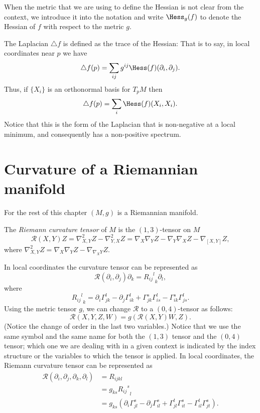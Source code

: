 When the metric that we are using to define the Hessian is not clear
from the context, we introduce it into the notation and write $\Hess_g(f)$ to denote the Hessian of $f$ with respect to the metric
$g$.


The Laplacian $\triangle f$ is defined as the
trace of the Hessian: That is to say, in local coordinates near $p$
we have
$$\triangle f(p)=\sum_{ij}g^{ij}\Hess(f)(\partial_i,\partial_j).$$
Thus, if $\{X_i\}$ is an orthonormal basis for $T_pM$ then
\begin{equation}\label{laplacformula}
\triangle f(p)=\sum_i\Hess(f)(X_i,X_i).\end{equation} Notice that this is
the form of the Laplacian that is non-negative at a local minimum, and
consequently has a non-positive spectrum.

\section{Curvature of a Riemannian manifold}

For the rest of this chapter $(M,g)$ is a Riemannian manifold.

\begin{definition}
\label{def:riemann-curvature-tensor}
\leanok
The \textit{Riemann curvature tensor} of $M$ is the  $(1,3)$-tensor on $M$
\[ {\mathcal R}(X,Y)Z = \nabla^{2}_{X,Y}Z
- \nabla^{2}_{Y,X}Z = \nabla_{X}\nabla_{Y}Z-\nabla_{Y}\nabla_{X}Z
-\nabla_{[X,Y]}Z, \] where
$\nabla^2_{X,Y}Z=\nabla_{X}\nabla_{Y}Z-\nabla_{\nabla_XY}Z$.
\end{definition}

In local coordinates the curvature tensor can be represented as \[
{\mathcal R}(\partial_i,\partial_j)\partial_k=
{{{R}_{ij}}^l}_k\partial_l, \] where
$${{R_{ij}}^l}_k=
\partial_i \Gamma^{l}_{jk}- \partial_j
\Gamma^{l}_{ik}+
\Gamma^{s}_{jk}\Gamma^{l}_{is}-\Gamma^{s}_{ik}\Gamma^{l}_{js}.$$
Using the metric tensor $g$, we can change ${\mathcal R}$ to a
$(0,4)$-tensor as follows:
\[ {\mathcal R}(X,Y,Z,W)=g({\mathcal R}(X,Y)W,Z). \]
(Notice the change of order in the last two variables.) Notice that
we use the same symbol and the same name for both the $(1,3)$ tensor
and the $(0,4)$ tensor; which one we are dealing with in a given
context is indicated by the index structure or the variables to
which the tensor is applied.  In local coordinates, the Riemann
curvature tensor can be represented as
\begin{align*} {\mathcal R}(\partial_i,\partial_j,\partial_k,\partial_l) & = R_{ijkl}\\
&=g_{ks}{{R_{ij}}^s}_l\\
&=g_{ks}(\partial_i \Gamma^{s}_{jl}- \partial_j \Gamma^{s}_{il}+
\Gamma^{t}_{jl}\Gamma^{s}_{it}-\Gamma^{t}_{il}\Gamma^{s}_{jt}).
\end{align*}


